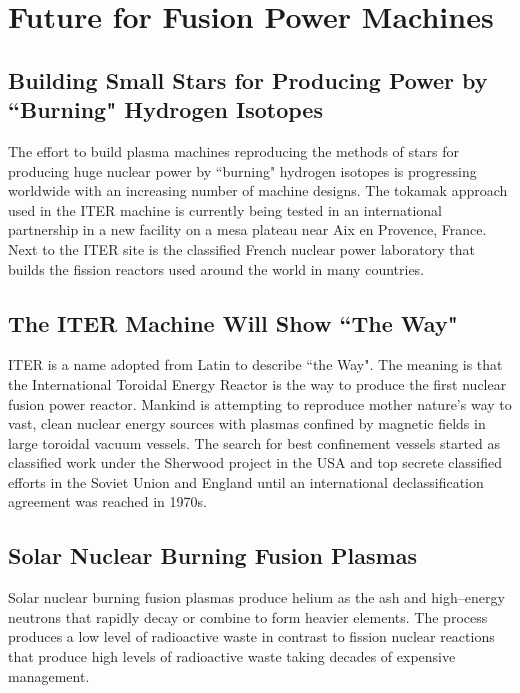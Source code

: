 \documentclass[a4paper,openany,12pt]{report}
\begin{document}
\chapter{Future for Fusion Power Machines}

\section{Building Small Stars for Producing Power by ``Burning" Hydrogen Isotopes}

The effort to build plasma machines reproducing the methods of stars for producing huge nuclear power by ``burning" hydrogen isotopes is progressing worldwide with an increasing number of machine designs. The tokamak approach used in the ITER machine is currently being tested in an international partnership in a new facility on a mesa plateau near Aix en Provence, France. Next to the ITER site is the classified French nuclear power laboratory that builds the fission reactors used around the world in many countries.

\section{The ITER Machine Will Show ``The Way"}

ITER is a name adopted from Latin to describe ``the Way". The meaning is that the International Toroidal Energy Reactor is the way to produce the first nuclear fusion power reactor. Mankind is attempting to reproduce mother nature's way to vast, clean nuclear energy sources with plasmas confined by magnetic fields in large toroidal vacuum vessels. The search for best confinement vessels started as classified work under the Sherwood project in the USA and top secrete classified efforts in the Soviet Union and England until an international declassification agreement was reached in 1970s.

\section{Solar Nuclear Burning Fusion Plasmas}

Solar nuclear burning fusion plasmas produce helium as the ash and high--energy neutrons that rapidly decay or combine to form heavier elements. The process produces a low level of radioactive waste in contrast to fission nuclear reactions that produce high levels of radioactive waste taking decades of expensive management.

\end{document}
